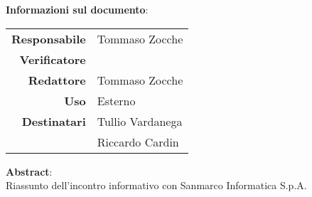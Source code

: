 \begin{center}
\textbf{Informazioni sul documento}: \\
\vspace{0.5cm}

\begin{tabular}{r|l}
    \textbf{Responsabile} & Tommaso Zocche \\
    \textbf{Verificatore} &  \\ 
    \textbf{Redattore} & Tommaso Zocche \\
    \textbf{Uso} & Esterno \\ 
    \textbf{Destinatari} & Tullio Vardanega \\ & Riccardo Cardin \\ 
\end{tabular}

\vfill

\textbf{Abstract}: \\
\vspace{0.5cm}
Riassunto dell'incontro informativo con Sanmarco Informatica S.p.A.
\end{center}


\bigskip